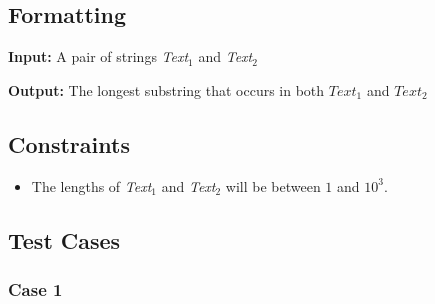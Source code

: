 \documentclass{article}
\begin{document}
\subsection*{Formatting}

\textbf{Input:} A pair of strings \emph{Text}$_1$ and \emph{Text}$_2$

\noindent\textbf{Output:} The longest substring that occurs in both $Text_1$ and $Text_2$

\subsection*{Constraints}

\begin{itemize}
    \item The lengths of \emph{Text}$_1$ and \emph{Text}$_2$ will be between $1$ and $10^3$.
\end{itemize}

\pagebreak

\subsection*{Test Cases}

\subsubsection*{Case 1}
\hline \vspace{5}
\end{document}
